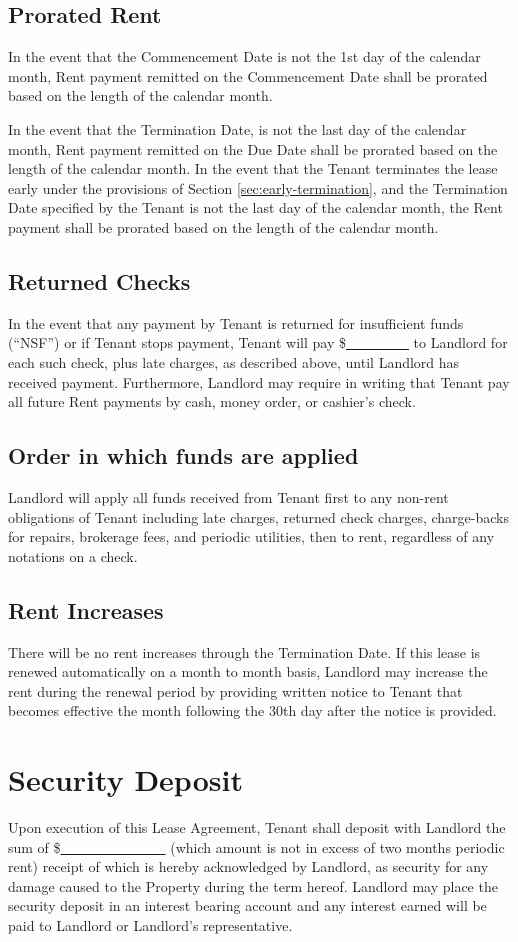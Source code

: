 \documentclass{amsart}
\begin{document}
\subsection{Prorated Rent}
In the event that the Commencement Date is not the 1st day of the calendar month,
Rent payment remitted on the Commencement Date shall be prorated based on the
length of the calendar month.

In the event that the Termination Date, is not the last day of the calendar
month, Rent payment remitted on the Due Date shall be prorated based on the
length of the calendar month. In the event that the Tenant terminates the lease
early under the provisions of Section \ref{sec:early-termination}, and the
Termination Date specified by the Tenant is not the last day of the calendar
month, the Rent payment shall be prorated based on the length of the calendar
month.
\subsection{Returned Checks}
In the event that any payment by Tenant is returned for insufficient funds
(``NSF'') or if Tenant stops payment, Tenant will pay
\$\underline{\ \ \ \ \ \ \ \ \ } to Landlord for each such check, plus late
charges, as described above, until Landlord has received payment. Furthermore,
Landlord may require in writing that Tenant pay all future Rent payments by
cash, money order, or cashier's check.
\subsection{Order in which funds are applied}
Landlord will apply all funds received from Tenant first to any non-rent
obligations of Tenant including late charges, returned check charges,
charge-backs for repairs, brokerage fees, and periodic utilities, then to rent,
regardless of any notations on a check.
\subsection{Rent Increases}
There will be no rent increases through the Termination Date. If this lease is
renewed automatically on a month to month basis, Landlord may increase the rent
during the renewal period by providing written notice to Tenant that becomes
effective the month following the 30th day after the notice is provided.
\section{Security Deposit}
Upon execution of this Lease Agreement, Tenant shall deposit with Landlord the
sum of \$\underline{\ \ \ \ \ \ \ \ \ \ \ \ \ \ \ } (which amount is not in
excess of two months periodic rent) receipt of which is hereby acknowledged by
Landlord, as security for any damage caused to the Property during the term
hereof. Landlord may place the security deposit in an interest bearing account
and any interest earned will be paid to Landlord or Landlord's representative.
\end{document}

